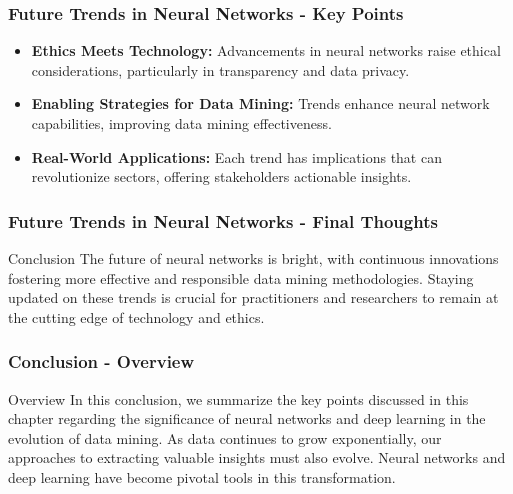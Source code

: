 \documentclass[aspectratio=169]{beamer}
\begin{document}
\begin{frame}[fragile]
    \frametitle{Future Trends in Neural Networks - Key Points}
    \begin{itemize}
        \item \textbf{Ethics Meets Technology:} Advancements in neural networks raise ethical considerations, particularly in transparency and data privacy.
        \item \textbf{Enabling Strategies for Data Mining:} Trends enhance neural network capabilities, improving data mining effectiveness.
        \item \textbf{Real-World Applications:} Each trend has implications that can revolutionize sectors, offering stakeholders actionable insights.
    \end{itemize}
\end{frame}

\begin{frame}[fragile]
    \frametitle{Future Trends in Neural Networks - Final Thoughts}
    \begin{block}{Conclusion}
        The future of neural networks is bright, with continuous innovations fostering more effective and responsible data mining methodologies. Staying updated on these trends is crucial for practitioners and researchers to remain at the cutting edge of technology and ethics.
    \end{block}
\end{frame}

\begin{frame}[fragile]
    \frametitle{Conclusion - Overview}
    \begin{block}{Overview}
        In this conclusion, we summarize the key points discussed in this chapter 
        regarding the significance of neural networks and deep learning in the evolution of 
        data mining. As data continues to grow exponentially, our approaches to extracting 
        valuable insights must also evolve. Neural networks and deep learning have become 
        pivotal tools in this transformation.
    \end{block}
\end{frame}
\end{document}
